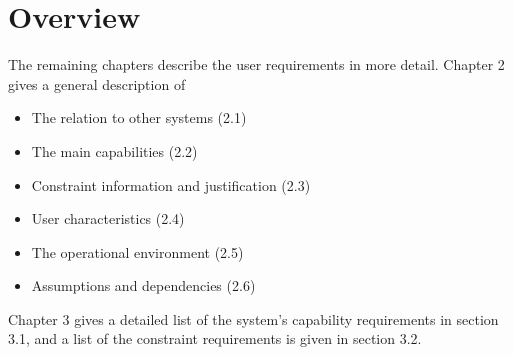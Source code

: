 



\section{Overview}

The remaining chapters describe the user requirements in more detail. Chapter 2 gives a general description of
\begin{itemize}
\item The relation to other systems (2.1)
\item The main capabilities (2.2)
\item Constraint information and justification (2.3)
\item User characteristics (2.4)
\item The operational environment (2.5)
\item Assumptions and dependencies (2.6)
\end{itemize}

Chapter 3 gives a detailed list of the system's capability requirements in section 3.1, and a list of the constraint requirements is given in section 3.2.


